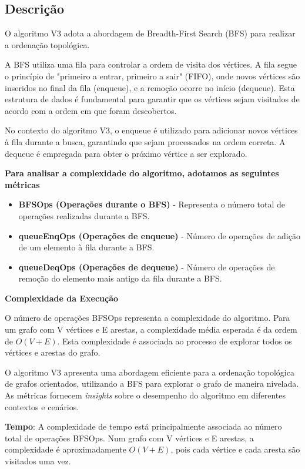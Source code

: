 \documentclass{report}
\begin{document}
\subsection{Descrição}

O algoritmo V3 adota a abordagem de Breadth-First Search (BFS) para realizar a ordenação topológica.

A BFS utiliza uma fila para controlar a ordem de visita dos vértices. A fila segue o princípio de "primeiro a entrar, primeiro a sair" (FIFO), onde novos vértices são inseridos no final da fila (enqueue), e a remoção ocorre no início (dequeue). Esta estrutura de dados é fundamental para garantir que os vértices sejam visitados de acordo com a ordem em que foram descobertos.

No contexto do algoritmo V3, o enqueue é utilizado para adicionar novos vértices à fila durante a busca, garantindo que sejam processados na ordem correta. A dequeue é empregada para obter o próximo vértice a ser explorado.

\textbf{Para analisar a complexidade do algoritmo, adotamos as seguintes métricas}

\begin{itemize}
            \item \textbf{BFSOps (Operações durante o BFS)} - Representa o número total de operações realizadas durante a BFS.
            \item \textbf{queueEnqOps (Operações de enqueue)} - Número de operações de adição de um elemento à fila durante a BFS.
            \item \textbf{queueDeqOps (Operações de dequeue)} - Número de operações de remoção do elemento mais antigo da fila durante a BFS.
\end{itemize}


\textbf{Complexidade da Execução}


O número de operações BFSOps representa a complexidade do algoritmo. Para um grafo com V vértices e E arestas, a complexidade média esperada é da ordem de \(O(V + E)\). Esta complexidade é associada ao processo de explorar todos os vértices e arestas do grafo.

O algoritmo V3 apresenta uma abordagem eficiente para a ordenação topológica de grafos orientados, utilizando a BFS para explorar o grafo de maneira nivelada. As métricas fornecem \textit{insights} sobre o desempenho do algoritmo em diferentes contextos e cenários.

\hfill

\textbf{Tempo}: A complexidade de tempo está principalmente associada ao número total de operações BFSOps. Num grafo com V vértices e E arestas, a complexidade é aproximadamente \(O(V + E)\), pois cada vértice e cada aresta são visitados uma vez.
\end{document}
